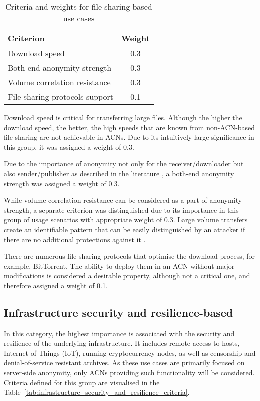 \begin{table}[!ht]
\centering
\caption{Criteria and weights for file sharing-based use cases}
\begin{tabular}{|l|c|}
\hline
\textbf{Criterion} & \textbf{Weight} \\
\hline
Download speed & 0.3 \\
Both-end anonymity strength & 0.3 \\
Volume correlation resistance & 0.3 \\
File sharing protocols support & 0.1 \\
\hline
\end{tabular}
\label{tab:file_sharing_criteria}
\end{table}

Download speed is critical for transferring large files. Although the higher the download speed, the better, the high speeds that are known from non-ACN-based file sharing are not achievable in ACNs. Due to its intuitively large significance in this group, it was assigned a weight of 0.3.

Due to the importance of anonymity not only for the receiver/downloader but also sender/publisher as described in the literature \cite{rewebber, freehaven}, a both-end anonymity strength was assigned a weight of 0.3.

While volume correlation resistance can be considered as a part of anonymity strength, a separate criterion was distinguished due to its importance in this group of usage scenarios with appropriate weight of 0.3. Large volume transfers create an identifiable pattern that can be easily distinguished by an attacker if there are no additional protections against it \cite{tor-design}.

There are numerous file sharing protocols that optimise the download process, for example, BitTorrent. The ability to deploy them in an ACN without major modifications is considered a desirable property, although not a critical one, and therefore assigned a weight of 0.1.

\subsection{Infrastructure security and resilience-based}
In this category, the highest importance is associated with the security and resilience of the underlying infrastructure. It includes remote access to hosts, Internet of Things (IoT), running cryptocurrency nodes, as well as censorship and denial-of-service resistant archives. As these use cases are primarily focused on server-side anonymity, only ACNs providing such functionality will be considered. Criteria defined for this group are visualised in the Table~\ref{tab:infrastructure_security_and_resilience_criteria}.


